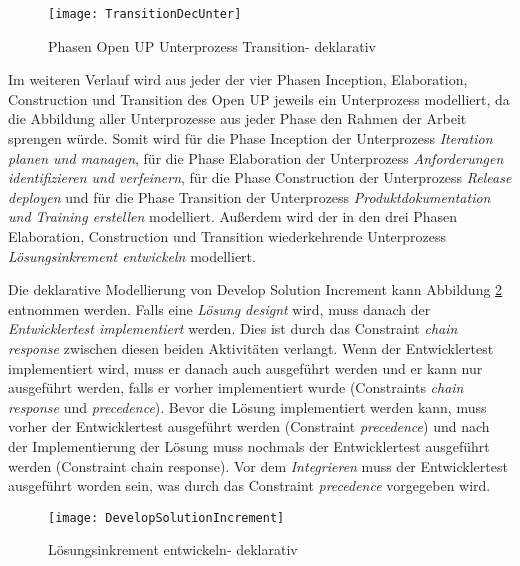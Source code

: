 \begin{figure}[htp]
\begin{center}
  \texttt{[image: TransitionDecUnter]} %
  \caption{Phasen Open UP Unterprozess Transition- deklarativ}
  \label{fig:TransitionDecUnter}
\end{center}
\end{figure}



Im weiteren Verlauf wird aus jeder der vier Phasen Inception, Elaboration, Construction und Transition des Open UP jeweils ein Unterprozess modelliert, da die Abbildung aller Unterprozesse aus jeder Phase den Rahmen der Arbeit sprengen würde. \newline
Somit wird für die Phase Inception der Unterprozess \textit{Iteration planen und managen}, für die Phase Elaboration der Unterprozess \textit{Anforderungen identifizieren und verfeinern}, für die Phase Construction der Unterprozess \textit{Release deployen} und für die Phase Transition der Unterprozess \textit{Produktdokumentation und Training erstellen} modelliert. Außerdem wird der in den drei Phasen Elaboration, Construction und Transition wiederkehrende Unterprozess \textit{Lösungsinkrement entwickeln} modelliert.


Die deklarative Modellierung von Develop Solution Increment kann Abbildung \ref{fig:Develop} entnommen werden.\newline
Falls eine \textit{Lösung designt} wird, muss danach der \textit{Entwicklertest implementiert} werden. Dies ist durch das Constraint \textit{chain response} zwischen diesen beiden Aktivitäten verlangt. Wenn der Entwicklertest implementiert wird, muss er danach auch ausgeführt werden und er kann nur ausgeführt werden, falls er vorher implementiert wurde (Constraints \textit{chain response} und \textit{precedence}).\newline
Bevor die Lösung implementiert werden kann, muss vorher der Entwicklertest ausgeführt werden (Constraint \textit{precedence}) und nach der Implementierung der Lösung muss nochmals der Entwicklertest ausgeführt werden (Constraint chain response).\newline
Vor dem \textit{Integrieren} muss der Entwicklertest ausgeführt worden sein, was durch das Constraint \textit{precedence} vorgegeben wird.
\begin{figure}[htp]
\begin{center}
  \texttt{[image: DevelopSolutionIncrement]} %
  \caption{Lösungsinkrement entwickeln- deklarativ}
  \label{fig:Develop}
\end{center}
\end{figure}


